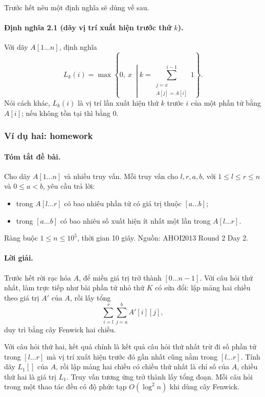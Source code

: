 \documentclass[11pt]{article}
\begin{document}
Trước hết nêu một định nghĩa sẽ dùng về sau.

\paragraph{Định nghĩa 2.1 (dãy vị trí xuất hiện trước thứ \(k\)).}
Với dãy \(A[1\ldots n]\), định nghĩa
\[
  L_k(i)=\max\left\{0,\ x\ \middle|
  k=\sum_{\substack{j=x\\ A[j]=A[i]}}^{i-1} 1\right\}.
\]
Nói cách khác, \(L_k(i)\) là vị trí lần xuất hiện thứ \(k\) trước \(i\) của
một phần tử bằng \(A[i]\); nếu không tồn tại thì bằng \(0\).

\subsubsection{Ví dụ hai: homework}

\paragraph{Tóm tắt đề bài.}
Cho dãy \(A[1\ldots n]\) và nhiều truy vấn. Mỗi truy vấn cho
\(l,r,a,b\), với \(1\le l\le r\le n\) và \(0\le a<b\), yêu cầu trả lời:
\begin{itemize}
  \item trong \(A[l\ldots r]\) có bao nhiêu phần tử có giá trị thuộc
  \([a\ldots b]\);
  \item trong \([a\ldots b]\) có bao nhiêu số xuất hiện ít nhất một lần trong
  \(A[l\ldots r]\).
\end{itemize}
Ràng buộc \(1\le n\le10^5\), thời gian 10 giây. Nguồn: AHOI2013 Round 2 Day 2.

\paragraph{Lời giải.}
Trước hết rời rạc hóa \(A\), để miền giá trị trở thành \([0\ldots n-1]\). Với
câu hỏi thứ nhất, làm trực tiếp như bài phần tử nhỏ thứ \(K\) có sửa đổi: lập
mảng hai chiều theo giá trị \(A'\) của \(A\), rồi lấy tổng
\[
  \sum_{i=l}^{r}\sum_{j=a}^{b} A'[i][j],
\]
duy trì bằng cây Fenwick hai chiều.

Với câu hỏi thứ hai, kết quả chính là kết quả câu hỏi thứ nhất trừ đi số phần
tử trong \([l\ldots r]\) mà vị trí xuất hiện trước đó gần nhất cũng nằm trong
\([l\ldots r]\). Tính dãy \(L_1[]\) của \(A\), rồi lập mảng hai chiều có chiều
thứ nhất là chỉ số của \(A\), chiều thứ hai là giá trị \(L_1\). Truy vấn tương
ứng trở thành lấy tổng đoạn. Mỗi câu hỏi trong một thao tác đều có độ phức tạp
\(O(\log^2 n)\) khi dùng cây Fenwick.
\end{document}
